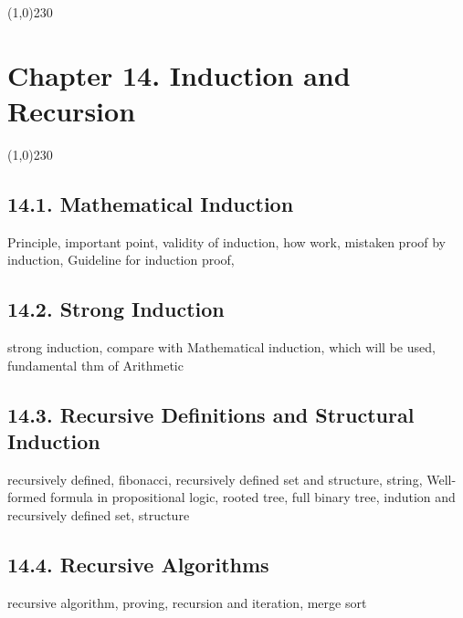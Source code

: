 \begin{center}
\line(1,0){230}
\end{center}

\section*{Chapter 14. Induction and Recursion}

\begin{center}
\line(1,0){230}
\end{center}

\subsection*{14.1. Mathematical Induction}

Principle, important point, validity of induction,
how work, mistaken proof by induction, Guideline for induction proof,

\subsection*{14.2. Strong Induction}

strong induction, compare with Mathematical induction, which will be used, fundamental thm of Arithmetic

\subsection*{14.3. Recursive Definitions and Structural Induction}

recursively defined, fibonacci, recursively defined set and structure, string, Well-formed formula in propositional logic, rooted tree, full binary tree, indution and recursively defined set, structure

\subsection*{14.4. Recursive Algorithms}

recursive algorithm, proving, recursion and iteration, merge sort